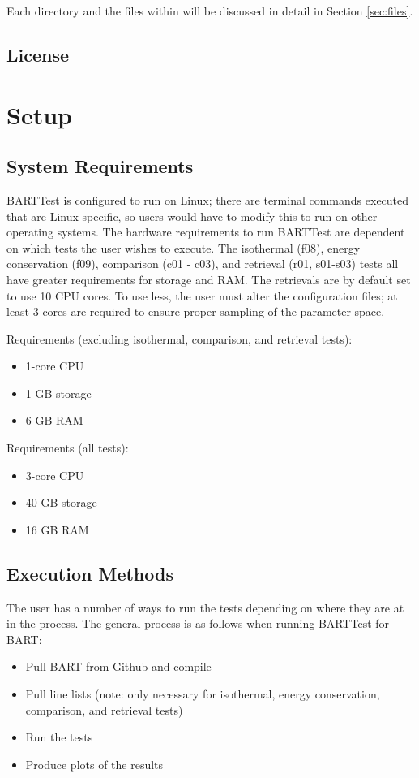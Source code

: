 \documentclass[letterpaper, 12pt]{article}
\begin{document}
Each directory and the files within will be discussed in detail in 
Section \ref{sec:files}.

\pagebreak
\subsection{License}
\label{sec:license}

\section{Setup}
\label{sec:setup}

\subsection{System Requirements}
\label{sec:requirements}
BARTTest is configured to run on Linux; there are terminal commands executed 
that are Linux-specific, so users would have to modify this to run on other 
operating systems. The hardware requirements to run BARTTest are dependent on 
which tests the user wishes to execute. The isothermal (f08), energy conservation (f09), comparison (c01 - c03), and 
retrieval (r01, s01-s03) tests all have greater requirements for storage and RAM. The retrievals are by default set to use 10 CPU 
cores. To use less, the user must alter the configuration files; at least 3 cores are required to ensure 
proper sampling of the parameter space.

Requirements (excluding isothermal, comparison, and retrieval tests):
\begin{itemize} \itemsep0pt
  \item 1-core CPU
  \item 1 GB storage
  \item 6 GB RAM
\end{itemize}

Requirements (all tests):
\begin{itemize} \itemsep0pt
  \item 3-core CPU
  \item 40 GB storage
  \item 16 GB RAM
\end{itemize}

\subsection{Execution Methods}
\label{sec:commands}
The user has a number of ways to run the tests depending on where they are at 
in the process. The general process is as follows when running BARTTest for 
BART:
\begin{itemize} \itemsep0pt
  \item Pull BART from Github and compile
  \item Pull line lists (note: only necessary for 
        isothermal, energy conservation, comparison, and retrieval tests)
  \item Run the tests
  \item Produce plots of the results
\end{itemize}
\end{document}
